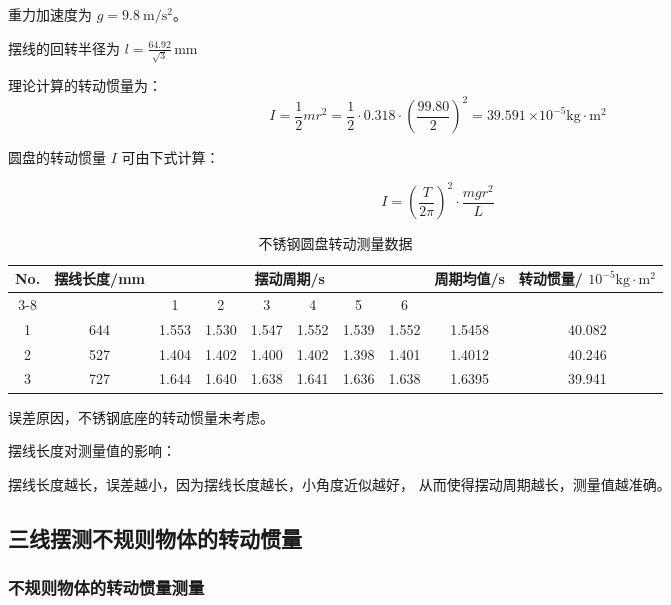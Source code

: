 \documentclass{article}
\begin{document}
重力加速度为 $g=9.8 \mathrm{~m} / \mathrm{s}^2$。

摆线的回转半径为 $l = \frac{64.92}{\sqrt{3}} \, \mathrm{mm}$

理论计算的转动惯量为：
$$
I=\frac{1}{2} m r^2=\frac{1}{2} \cdot 0.318 \cdot \left(\frac{99.80}{2}\right)^2=39.591 \, \mathrm{\times 10^{-5}kg} \cdot \mathrm{m}^2
$$


圆盘的转动惯量 $I$ 可由下式计算：

$$
I=\left(\frac{T}{2 \pi}\right)^2 \cdot \frac{m g r^2}{L}
$$

\begin{table}[h!]
\centering
\renewcommand{\arraystretch}{1.5}
\setlength{\tabcolsep}{8pt}
\begin{tabular}{|c|c|c|c|c|c|c|c|c|c|}
\hline
\multirow{3}{*}{\textbf{No.}} & \multirow{3}{*}{\textbf{摆线长度/mm}} & \multicolumn{6}{c|}{\textbf{摆动周期/s}} & \multirow{3}{*}{\textbf{周期均值/s}} & \multirow{3}{*}{\textbf{转动惯量/ $ \mathrm{10^{-5}kg \cdot m^2} $}}  \\ \cline{3-8}
& & 1 & 2 & 3 & 4 & 5 & 6 & & \\ \hline
1 & 644 & 1.553 & 1.530 & 1.547 & 1.552 & 1.539 & 1.552 & 1.5458 & 40.082 \\ \hline
2 & 527 & 1.404 & 1.402 & 1.400 & 1.402 & 1.398 & 1.401 & 1.4012 & 40.246 \\ \hline
3 & 727 & 1.644 & 1.640 & 1.638 & 1.641 & 1.636 & 1.638 & 1.6395 & 39.941 \\ \hline
\end{tabular}
\caption{不锈钢圆盘转动测量数据}
\label{tab:raw_data}
\end{table}

误差原因，不锈钢底座的转动惯量未考虑。

摆线长度对测量值的影响：

摆线长度越长，误差越小，因为摆线长度越长，小角度近似越好，
从而使得摆动周期越长，测量值越准确。
\subsection{三线摆测不规则物体的转动惯量}
\subsubsection{不规则物体的转动惯量测量}
\end{document}

